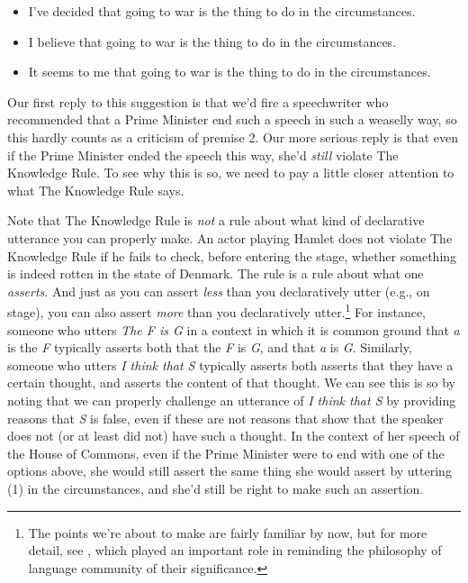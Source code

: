 \begin{itemize}
\item I've decided that going to war is the thing to do in the circumstances.
\item I believe that going to war is the thing to do in the circumstances.
\item It seems to me that going to war is the thing to do in the circumstances.
\end{itemize}

\noindent Our first reply to this suggestion is that we'd fire a speechwriter who recommended that a Prime Minister end such a speech in such a weaselly way, so this hardly counts as a criticism of premise 2. Our more serious reply is that even if the Prime Minister ended the speech this way, she'd \textit{still} violate The Knowledge Rule. To see why this is so, we need to pay a little closer attention to what The Knowledge Rule says.

Note that The Knowledge Rule is \textit{not} a rule about what kind of declarative utterance you can properly make. An actor playing Hamlet does not violate The Knowledge Rule if he fails to check, before entering the stage, whether something is indeed rotten in the state of Denmark. The rule is a rule about what one \textit{asserts}. And just as you can assert \textit{less} than you declaratively utter (e.g., on stage), you can also assert \textit{more} than you declaratively utter.\footnote{The points we're about to make are fairly familiar by now, but for more detail, see \citet{Cappelen2005}, which played an important role in reminding the philosophy of language community of their significance.} For instance, someone who utters \textit{The F is G} in a context in which it is common ground that \textit{a} is the \textit{F} typically asserts both that the \textit{F} is \textit{G}, and that \textit{a} is \textit{G}. Similarly, someone who utters \textit{I think that S} typically asserts both asserts that they have a certain thought, and asserts the content of that thought. We can see this is so by noting that we can properly challenge an utterance of \textit{I think that S} by providing reasons that \textit{S} is false, even if these are not reasons that show that the speaker does not (or at least did not) have such a thought. In the context of her speech of the House of Commons, even if the Prime Minister were to end with one of the options above, she would still assert the same thing she would assert by uttering (1) in the circumstances, and she'd still be right to make such an assertion.

